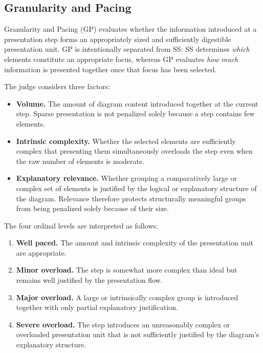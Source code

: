 \documentclass{article} %
\begin{document}
\subsection{Granularity and Pacing}
\label{sec:supp_gp}

Granularity and Pacing (GP) evaluates whether the information introduced at a
presentation step forms an appropriately sized and sufficiently digestible
presentation unit. GP is intentionally separated from SS: SS determines
\emph{which} elements constitute an appropriate focus, whereas GP evaluates
\emph{how much} information is presented together once that focus has been
selected.

The judge considers three factors:

\begin{itemize}
    \item \textbf{Volume.}
    The amount of diagram content introduced together at the current step.
    Sparse presentation is not penalized solely because a step contains few
    elements.

    \item \textbf{Intrinsic complexity.}
    Whether the selected elements are sufficiently complex that presenting
    them simultaneously overloads the step even when the raw number of
    elements is moderate.

    \item \textbf{Explanatory relevance.}
    Whether grouping a comparatively large or complex set of elements is
    justified by the logical or explanatory structure of the diagram.
    Relevance therefore protects structurally meaningful groups from being
    penalized solely because of their size.
\end{itemize}

The four ordinal levels are interpreted as follows:

\begin{enumerate}
    \item[4.] \textbf{Well paced.}
    The amount and intrinsic complexity of the presentation unit are
    appropriate.

    \item[3.] \textbf{Minor overload.}
    The step is somewhat more complex than ideal but remains well justified by
    the presentation flow.

    \item[2.] \textbf{Major overload.}
    A large or intrinsically complex group is introduced together with only
    partial explanatory justification.

    \item[1.] \textbf{Severe overload.}
    The step introduces an unreasonably complex or overloaded presentation
    unit that is not sufficiently justified by the diagram's explanatory
    structure.
\end{enumerate}
\end{document}
